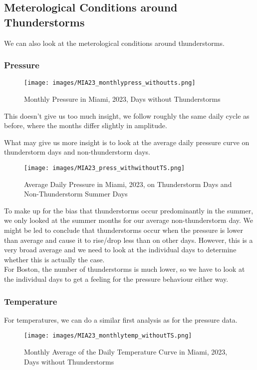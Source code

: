 \documentclass[12pt, parskip=half]{scrartcl}
\begin{document}
\subsection{Meterological Conditions around Thunderstorms}
We can also look at the meterological conditions around thunderstorms.

\subsubsection{Pressure}

\begin{figure}[!h]
\centering
\texttt{[image: images/MIA23\_monthlypress\_withoutts.png]}
\caption{Monthly Pressure in Miami, 2023, Days without Thunderstorms}
\end{figure}

This doesn't give us too much insight, we follow roughly the same daily cycle as before, where the months differ slightly in amplitude.

What may give us more insight is to look at the average daily pressure curve on thunderstorm days and non-thunderstorm days.

\begin{figure}[!h]
\centering
\texttt{[image: images/MIA23\_press\_withwithoutTS.png]}
\caption{Average Daily Pressure in Miami, 2023, on Thunderstorm Days and Non-Thunderstorm Summer Days}
\end{figure}

To make up for the bias that thunderstorms occur predominantly in the summer, we only looked at the summer months for our average non-thunderstorm day.
We might be led to conclude that thunderstorms occur when the pressure is lower than average and cause it to rise/drop less than on other days.
However, this is a very broad average and we need to look at the individual days to determine whether this is actually the case.\\

For Boston, the number of thunderstorms is much lower, so we have to look at the individual days to get a feeling for the pressure behaviour either way.

\subsubsection{Temperature}
For temperatures, we can do a similar first analysis as for the pressure data.

\begin{figure}[!h]
\centering
\texttt{[image: images/MIA23\_monthlytemp\_withoutTS.png]}
\caption{Monthly Average of the Daily Temperature Curve in Miami, 2023, Days without Thunderstorms}
\end{figure}
\end{document}
